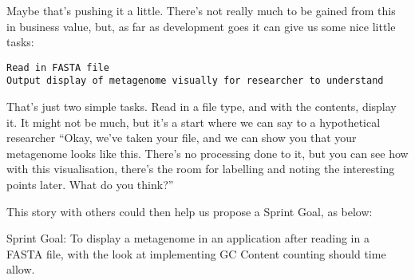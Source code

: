 Maybe that’s pushing it a little. There’s not really much to be gained from this in business value, but, as far as development goes it can give us some nice little tasks:
\begin{verbatim}
Read in FASTA file
Output display of metagenome visually for researcher to understand
\end{verbatim}
That’s just two simple tasks. Read in a file type, and with the contents, display it. It might not be much, but it’s a start where we can say to a hypothetical researcher “Okay, we’ve taken your file, and we can show you that your metagenome looks like this. There’s no processing done to it, but you can see how with this visualisation, there’s the room for labelling and noting the interesting points later. What do you think?”

This story with others could then help us propose a Sprint Goal, as below:

Sprint Goal:
To display a metagenome in an application after reading in a FASTA file, with the look at implementing GC Content counting should time allow.